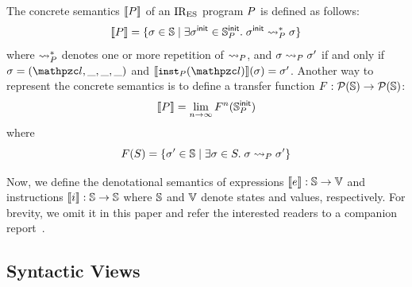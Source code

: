 The concrete semantics $\llbracket{P}\rrbracket$ of an $\text{IR}_\text{ES}$ program $P$ is defined as
follows:
\[
  \llbracket{P}\rrbracket = \{ \sigma \in \mathbb{S} \mid \exists \sigma^{\textsf{init}} \in \mathbb{S}^{\textsf{init}}_{P}. \;
  \sigma^{\textsf{init}} \leadsto_{P}^* \sigma \}
\]
where $\leadsto_{P}^*$ denotes one or more repetition of $\leadsto_{P}$, and
$\sigma \leadsto_{P} \sigma'$ if and only if $\st = (\lab, \_, \_, \_)$ and
$\sem{\getinst{\prog}(\lab)}(\st) = \st'$. Another way to represent the concrete
semantics is to define a transfer function $F: \mathcal{P}(\mathbb{S})
\rightarrow \mathcal{P}(\mathbb{S})$:
\[
  \llbracket{P}\rrbracket = \lim_{n \rightarrow \infty}F^n(\mathbb{S}^{\textsf{init}}_{P})
\]
where
\begin{equation}\label{eqn:transfer}
  F(S) = \{ \sigma' \in \mathbb{S} \mid \exists \sigma \in S. \; \sigma \leadsto_{P}
  \sigma' \}
\end{equation}

Now, we define the denotational semantics of expressions $\llbracket{e}\rrbracket: \mathbb{S}
\rightarrow \mathbb{V}$ and instructions $\llbracket{i}\rrbracket: \mathbb{S} \rightarrow \mathbb{S}$
where $\mathbb{S}$ and $\mathbb{V}$ denote states and values, respectively.  For
brevity, we omit it in this paper and refer the interested readers to a
companion report~\cite{report}.

\subsection{Syntactic Views}\label{sec:view}

